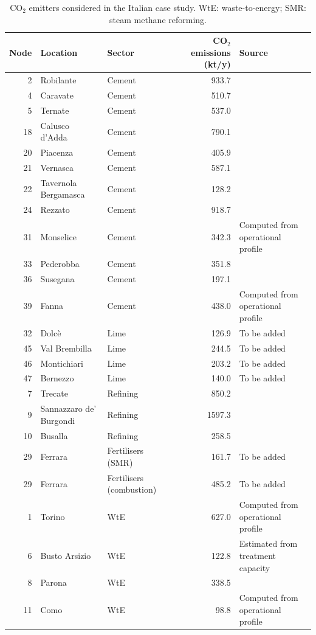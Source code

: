 \begin{table}[ht]
\centering
\small
\caption{CO$_2$ emitters considered in the Italian case study. WtE: waste-to-energy; SMR: steam methane reforming.}
\label{tab:emitters}
\begin{tabular}{rllrl}
\hline
Node & Location & Sector & CO$_2$ emissions (kt/y) & Source \\
\hline
2 & Robilante & Cement & 933.7 & \cite{} \\
4 & Caravate & Cement & 510.7 & \cite{} \\
5 & Ternate & Cement & 537.0 & \cite{} \\
18 & Calusco d'Adda & Cement & 790.1 & \cite{} \\
20 & Piacenza & Cement & 405.9 & \cite{} \\
21 & Vernasca & Cement & 587.1 & \cite{} \\
22 & Tavernola Bergamasca & Cement & 128.2 & \cite{} \\
24 & Rezzato & Cement & 918.7 & \cite{} \\
31 & Monselice & Cement & 342.3 & Computed from operational profile \\
33 & Pederobba & Cement & 351.8 & \cite{} \\
36 & Susegana & Cement & 197.1 & \cite{} \\
39 & Fanna & Cement & 438.0 & Computed from operational profile \\
32 & Dolcè & Lime & 126.9 & To be added \\
45 & Val Brembilla & Lime & 244.5 & To be added \\
46 & Montichiari & Lime & 203.2 & To be added \\
47 & Bernezzo & Lime & 140.0 & To be added \\
7 & Trecate & Refining & 850.2 & \cite{} \\
9 & Sannazzaro de' Burgondi & Refining & 1597.3 & \cite{} \\
10 & Busalla & Refining & 258.5 & \cite{} \\
29 & Ferrara & Fertilisers (SMR) & 161.7 & To be added \\
29 & Ferrara & Fertilisers (combustion) & 485.2 & To be added \\
1 & Torino & WtE & 627.0 & Computed from operational profile \\
6 & Busto Arsizio & WtE & 122.8 & Estimated from treatment capacity \\
8 & Parona & WtE & 338.5 & \cite{} \\
11 & Como & WtE & 98.8 & Computed from operational profile \\

\end{tabular}
\end{table}
